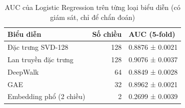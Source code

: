 \begin{table}[htbp]
\caption{AUC của Logistic Regression trên từng loại biểu diễn (có giám sát, chỉ để chẩn đoán)}
\label{tab:rq2_probe}
\begin{tabular}{lrl}
\toprule
Biểu diễn & Số chiều & AUC (5-fold) \\
\midrule
Đặc trưng SVD-128 & 128 & 0.8876 ± 0.0021 \\
Lan truyền đặc trưng & 128 & 0.9076 ± 0.0037 \\
DeepWalk & 64 & 0.8849 ± 0.0028 \\
GAE & 32 & 0.8962 ± 0.0021 \\
Embedding phổ (2 chiều) & 2 & 0.2699 ± 0.0039 \\
\bottomrule
\end{tabular}
\end{table}
